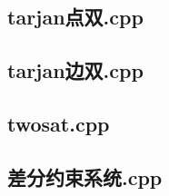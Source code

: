 \subsection{tarjan点双.cpp}


\subsection{tarjan边双.cpp}


\subsection{twosat.cpp}


\subsection{差分约束系统.cpp}


